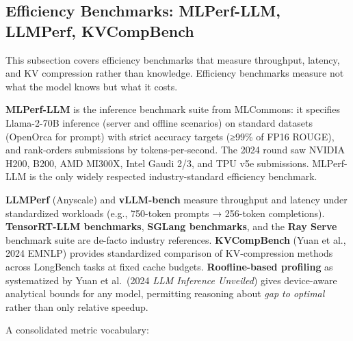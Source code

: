 \subsection{Efficiency Benchmarks: MLPerf-LLM, LLMPerf, KVCompBench}\label{efficiency-benchmarks-mlperf-llm-llmperf-kvcompbench}

This subsection covers efficiency benchmarks that measure throughput, latency, and KV compression rather than knowledge. Efficiency benchmarks measure not what the model knows but what it costs.

\textbf{MLPerf-LLM} is the inference benchmark suite from MLCommons: it specifies Llama-2-70B inference (server and offline scenarios) on standard datasets (OpenOrca for prompt) with strict accuracy targets (≥99\% of FP16 ROUGE), and rank-orders submissions by tokens-per-second. The 2024 round saw NVIDIA H200, B200, AMD MI300X, Intel Gaudi 2/3, and TPU v5e submissions. MLPerf-LLM is the only widely respected industry-standard efficiency benchmark.

\textbf{LLMPerf} (Anyscale) and \textbf{vLLM-bench} measure throughput and latency under standardized workloads (e.g., 750-token prompts → 256-token completions). \textbf{TensorRT-LLM benchmarks}, \textbf{SGLang benchmarks}, and the \textbf{Ray Serve} benchmark suite are de-facto industry references. \textbf{KVCompBench} (Yuan et al., 2024 EMNLP) provides standardized comparison of KV-compression methods across LongBench tasks at fixed cache budgets. \textbf{Roofline-based profiling} as systematized by Yuan et al.~(2024 \emph{LLM Inference Unveiled}) gives device-aware analytical bounds for any model, permitting reasoning about \emph{gap to optimal} rather than only relative speedup.

A consolidated metric vocabulary:

